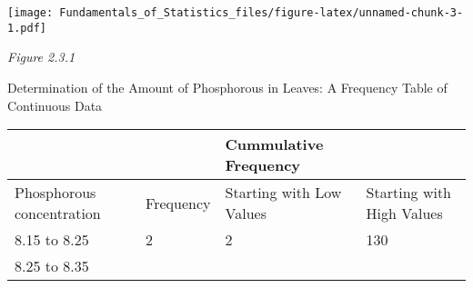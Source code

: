 \documentclass[]{article}
\begin{document}
\texttt{[image: Fundamentals\_of\_Statistics\_files/figure-latex/unnamed-chunk-3-1.pdf]}

\emph{Figure 2.3.1}

Determination of the Amount of Phosphorous in Leaves: A Frequency Table
of Continuous Data

\begin{longtable}[]{@{}llll@{}}
\toprule
\begin{minipage}[b]{0.22\columnwidth}\raggedright
\strut
\end{minipage} & \begin{minipage}[b]{0.22\columnwidth}\raggedright
\strut
\end{minipage} & \begin{minipage}[b]{0.22\columnwidth}\raggedright
Cummulative Frequency\strut
\end{minipage} & \begin{minipage}[b]{0.22\columnwidth}\raggedright
\strut
\end{minipage}\tabularnewline
\midrule
\endhead
\begin{minipage}[t]{0.22\columnwidth}\raggedright
Phosphorous concentration\strut
\end{minipage} & \begin{minipage}[t]{0.22\columnwidth}\raggedright
Frequency\strut
\end{minipage} & \begin{minipage}[t]{0.22\columnwidth}\raggedright
Starting with Low Values\strut
\end{minipage} & \begin{minipage}[t]{0.22\columnwidth}\raggedright
Starting with High Values\strut
\end{minipage}\tabularnewline
\begin{minipage}[t]{0.22\columnwidth}\raggedright
8.15 to 8.25\strut
\end{minipage} & \begin{minipage}[t]{0.22\columnwidth}\raggedright
2\strut
\end{minipage} & \begin{minipage}[t]{0.22\columnwidth}\raggedright
2\strut
\end{minipage} & \begin{minipage}[t]{0.22\columnwidth}\raggedright
130\strut
\end{minipage}\tabularnewline
\begin{minipage}[t]{0.22\columnwidth}\raggedright
8.25 to 8.35\strut
\end{minipage} & \begin{minipage}[t]{0.22\columnwidth}\raggedright

\end{minipage}
\end{longtable}
\end{document}
